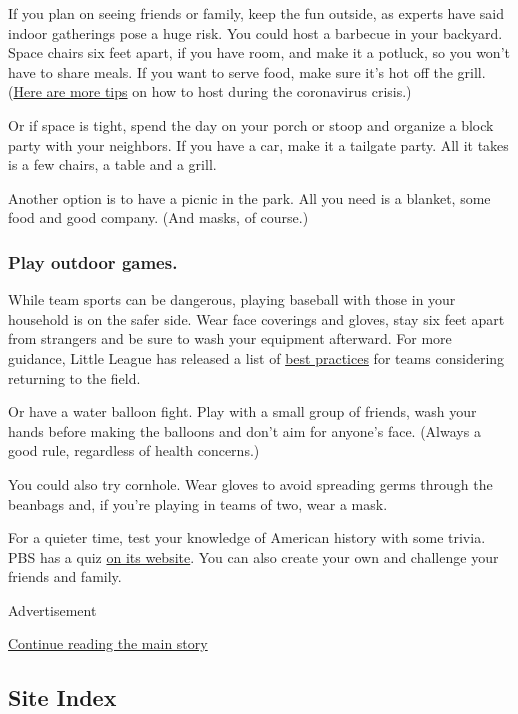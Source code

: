 If you plan on seeing friends or family, keep the fun outside, as
experts have said indoor gatherings pose a huge risk. You could host a
barbecue in your backyard. Space chairs six feet apart, if you have
room, and make it a potluck, so you won't have to share meals. If you
want to serve food, make sure it's hot off the grill.
(\href{https://www.nytimes3xbfgragh.onion/2020/06/06/at-home/coronavirus-how-to-have-friends-over.html}{Here
are more tips} on how to host during the coronavirus crisis.)

Or if space is tight, spend the day on your porch or stoop and organize
a block party with your neighbors. If you have a car, make it a tailgate
party. All it takes is a few chairs, a table and a grill.

Another option is to have a picnic in the park. All you need is a
blanket, some food and good company. (And masks, of course.)

\hypertarget{play-outdoor-games}{%
\subsubsection{Play outdoor games.}\label{play-outdoor-games}}

While team sports can be dangerous, playing baseball with those in your
household is on the safer side. Wear face coverings and gloves, stay six
feet apart from strangers and be sure to wash your equipment afterward.
For more guidance, Little League has released a list of
\href{https://www.littleleague.org/downloads/best-practices/}{best
practices} for teams considering returning to the field.

Or have a water balloon fight. Play with a small group of friends, wash
your hands before making the balloons and don't aim for anyone's face.
(Always a good rule, regardless of health concerns.)

You could also try cornhole. Wear gloves to avoid spreading germs
through the beanbags and, if you're playing in teams of two, wear a
mask.

For a quieter time, test your knowledge of American history with some
trivia. PBS has a quiz
\href{http://www.pbs.org/a-capitol-fourth/fireworks-fun/history-quiz/}{on
its website}. You can also create your own and challenge your friends
and family.

Advertisement

\protect\hyperlink{after-bottom}{Continue reading the main story}

\hypertarget{site-index}{%
\subsection{Site Index}\label{site-index}}

